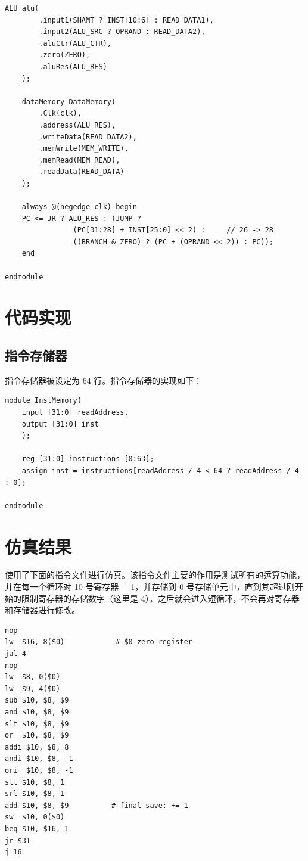 \documentclass[a4paper,UTF8]{ctexart}
\begin{document}
\begin{lstlisting}[caption=Top.v]
    ALU alu(
        .input1(SHAMT ? INST[10:6] : READ_DATA1),  
        .input2(ALU_SRC ? OPRAND : READ_DATA2),
        .aluCtr(ALU_CTR),
        .zero(ZERO),
        .aluRes(ALU_RES)
    );

    dataMemory DataMemory(
        .Clk(clk),
        .address(ALU_RES),
        .writeData(READ_DATA2),
        .memWrite(MEM_WRITE),
        .memRead(MEM_READ),
        .readData(READ_DATA)
    );

    always @(negedge clk) begin
    PC <= JR ? ALU_RES : (JUMP ? 
                (PC[31:28] + INST[25:0] << 2) :     // 26 -> 28
                ((BRANCH & ZERO) ? (PC + (OPRAND << 2)) : PC));
    end

endmodule
\end{lstlisting}

\section{代码实现}

\subsection{指令存储器}

指令存储器被设定为 64 行。指令存储器的实现如下：

\begin{lstlisting}[caption=InstMemory.v]
module InstMemory(
    input [31:0] readAddress,
    output [31:0] inst
    );

    reg [31:0] instructions [0:63];
    assign inst = instructions[readAddress / 4 < 64 ? readAddress / 4 : 0];

endmodule
\end{lstlisting}

\section{仿真结果}

使用了下面的指令文件进行仿真。该指令文件主要的作用是测试所有的运算功能，并在每一个循环对 10 号寄存器 + 1，并存储到 0 号存储单元中，直到其超过刚开始的限制寄存器的存储数字（这里是 4），之后就会进入短循环，不会再对寄存器和存储器进行修改。

\begin{lstlisting}[caption=simple.asm]
nop
lw  $16, 8($0)            # $0 zero register
jal 4
nop
lw  $8, 0($0)
lw  $9, 4($0)
sub $10, $8, $9
and $10, $8, $9
slt $10, $8, $9
or  $10, $8, $9
addi $10, $8, 8
andi $10, $8, -1
ori  $10, $8, -1
sll $10, $8, 1
srl $10, $8, 1
add $10, $8, $9          # final save: += 1
sw  $10, 0($0)
beq $10, $16, 1
jr $31
j 16
\end{lstlisting}
\end{document}
